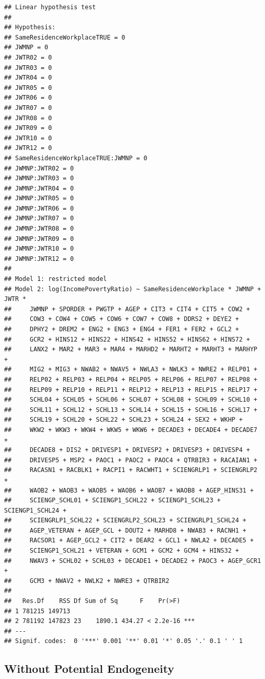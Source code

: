 \documentclass[
]{article}
\begin{document}
\begin{verbatim}
## Linear hypothesis test
## 
## Hypothesis:
## SameResidenceWorkplaceTRUE = 0
## JWMNP = 0
## JWTR02 = 0
## JWTR03 = 0
## JWTR04 = 0
## JWTR05 = 0
## JWTR06 = 0
## JWTR07 = 0
## JWTR08 = 0
## JWTR09 = 0
## JWTR10 = 0
## JWTR12 = 0
## SameResidenceWorkplaceTRUE:JWMNP = 0
## JWMNP:JWTR02 = 0
## JWMNP:JWTR03 = 0
## JWMNP:JWTR04 = 0
## JWMNP:JWTR05 = 0
## JWMNP:JWTR06 = 0
## JWMNP:JWTR07 = 0
## JWMNP:JWTR08 = 0
## JWMNP:JWTR09 = 0
## JWMNP:JWTR10 = 0
## JWMNP:JWTR12 = 0
## 
## Model 1: restricted model
## Model 2: log(IncomePovertyRatio) ~ SameResidenceWorkplace * JWMNP + JWTR * 
##     JWMNP + SPORDER + PWGTP + AGEP + CIT3 + CIT4 + CIT5 + COW2 + 
##     COW3 + COW4 + COW5 + COW6 + COW7 + COW8 + DDRS2 + DEYE2 + 
##     DPHY2 + DREM2 + ENG2 + ENG3 + ENG4 + FER1 + FER2 + GCL2 + 
##     GCR2 + HINS12 + HINS22 + HINS42 + HINS52 + HINS62 + HINS72 + 
##     LANX2 + MAR2 + MAR3 + MAR4 + MARHD2 + MARHT2 + MARHT3 + MARHYP + 
##     MIG2 + MIG3 + NWAB2 + NWAV5 + NWLA3 + NWLK3 + NWRE2 + RELP01 + 
##     RELP02 + RELP03 + RELP04 + RELP05 + RELP06 + RELP07 + RELP08 + 
##     RELP09 + RELP10 + RELP11 + RELP12 + RELP13 + RELP15 + RELP17 + 
##     SCHL04 + SCHL05 + SCHL06 + SCHL07 + SCHL08 + SCHL09 + SCHL10 + 
##     SCHL11 + SCHL12 + SCHL13 + SCHL14 + SCHL15 + SCHL16 + SCHL17 + 
##     SCHL19 + SCHL20 + SCHL22 + SCHL23 + SCHL24 + SEX2 + WKHP + 
##     WKW2 + WKW3 + WKW4 + WKW5 + WKW6 + DECADE3 + DECADE4 + DECADE7 + 
##     DECADE8 + DIS2 + DRIVESP1 + DRIVESP2 + DRIVESP3 + DRIVESP4 + 
##     DRIVESP5 + MSP2 + PAOC1 + PAOC2 + PAOC4 + QTRBIR3 + RACAIAN1 + 
##     RACASN1 + RACBLK1 + RACPI1 + RACWHT1 + SCIENGRLP1 + SCIENGRLP2 + 
##     WAOB2 + WAOB3 + WAOB5 + WAOB6 + WAOB7 + WAOB8 + AGEP_HINS31 + 
##     SCIENGP_SCHL01 + SCIENGP1_SCHL22 + SCIENGP1_SCHL23 + SCIENGP1_SCHL24 + 
##     SCIENGRLP1_SCHL22 + SCIENGRLP2_SCHL23 + SCIENGRLP1_SCHL24 + 
##     AGEP_VETERAN + AGEP_GCL + DOUT2 + MARHD8 + NWAB3 + RACNH1 + 
##     RACSOR1 + AGEP_GCL2 + CIT2 + DEAR2 + GCL1 + NWLA2 + DECADE5 + 
##     SCIENGP1_SCHL21 + VETERAN + GCM1 + GCM2 + GCM4 + HINS32 + 
##     NWAV3 + SCHL02 + SCHL03 + DECADE1 + DECADE2 + PAOC3 + AGEP_GCR1 + 
##     GCM3 + NWAV2 + NWLK2 + NWRE3 + QTRBIR2
## 
##   Res.Df    RSS Df Sum of Sq      F    Pr(>F)    
## 1 781215 149713                                  
## 2 781192 147823 23    1890.1 434.27 < 2.2e-16 ***
## ---
## Signif. codes:  0 '***' 0.001 '**' 0.01 '*' 0.05 '.' 0.1 ' ' 1
\end{verbatim}

\hypertarget{without-potential-endogeneity}{%
\subsection{Without Potential
Endogeneity}\label{without-potential-endogeneity}}
\end{document}
